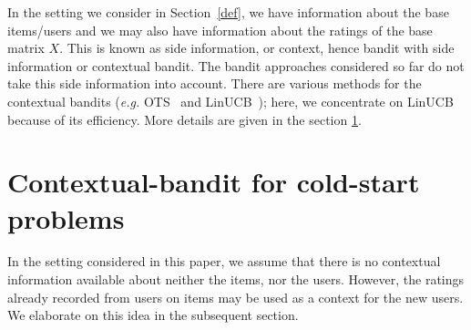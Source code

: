 \documentclass[twoside,leqno,twocolumn]{article}
\newcommand{\jm}[1]{{\color{TealBlue}(jm) #1\color{black}}}
\newcommand{\hai}[1]{\color{blue}(hai) #1\color{black}}
\newcommand{\eg}{\textit{e.g.}}
\begin{document}

In the setting we consider in Section~\ref{def}, we have information about the base items/users and we may also have information about the ratings of the base matrix $X$. This is known as side information, or context, hence bandit with side information or contextual bandit. The bandit approaches considered so far do not take this side information into account. There are various methods for the contextual bandits (\eg{} OTS~\cite{May-et-al:2012} and LinUCB~\cite{LinUCB}); here, we concentrate on LinUCB~\cite{LinUCB} because of its efficiency. More details are given in the section \ref{linucb}. 
%
%
%
%
%
%




\section{Contextual-bandit for cold-start problems}
\label{linucb}
In the setting considered in this paper, we assume that there is no contextual information available about neither the items, nor the users. However, the ratings already recorded from users on items may be used as a context for the new users. We elaborate on this idea in the subsequent section.
\end{document}
